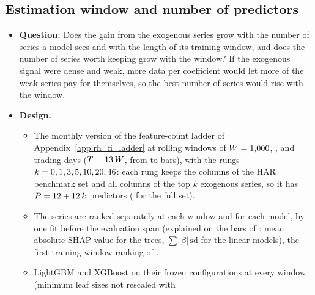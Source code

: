 \subsection{Estimation window and number of predictors}
\label{app:rh_fi_scaling}
% 
\begin{itemize}
\item \textbf{Question.} Does the gain from the exogenous series grow with the number of series a model sees and
  with the length of its training window, and does the number of series worth keeping grow with the window? If the
  exogenous signal were dense and weak, more data per coefficient would let more of the weak series pay for
  themselves, so the best number of series would rise with the window.
\item \textbf{Design.}
  \begin{itemize}
  \item The monthly version of the feature-count ladder of Appendix~\ref{app:rh_fi_ladder} at rolling windows of
    $W = 1{,}000$, \rhcxWTwo,
    \rhcxWMain{} and \rhcxWLong{} trading days ($T = 13\,W$, from \rhcxTOne{} to \rhcxTLong{} bars), with the rungs
    $k = 0, 1, 3, 5, 10, 20, 46$: each rung keeps the \rhcxPHar{} columns of the HAR benchmark set and all
    columns of the top $k$ exogenous series, so it has $P = 12 + 12\,k$ predictors (\rhcxPFull{}
    for the full set).
  \item The series are ranked separately at each window and for each model, by one fit before the evaluation span
    (explained on the bars of \rhorPenYears: mean absolute SHAP value for the trees, $\sum |\beta|\,\mathrm{sd}$ for
    the linear models), the first-training-window ranking of \citet{MaischZhangUlrichZimmer2026}.
  \item LightGBM and XGBoost on their frozen configurations at every window (minimum leaf sizes not rescaled with

\end{itemize}
\end{itemize}
